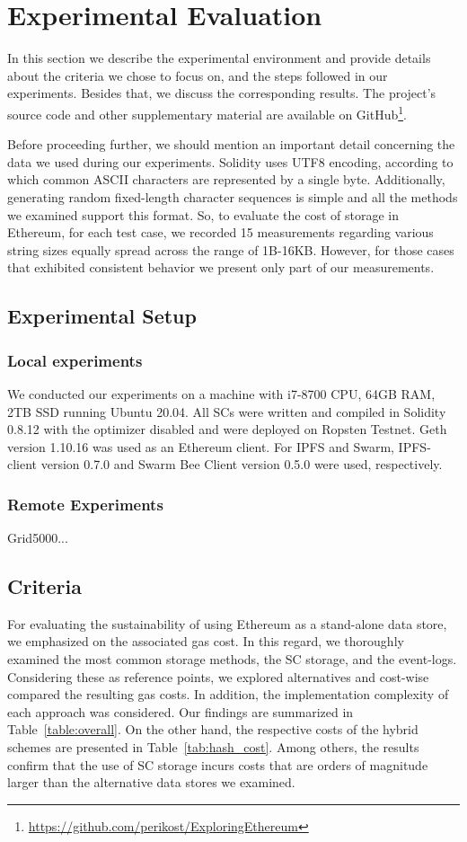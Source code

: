 \chapter{Experimental Evaluation}\label{chapter:experiments}
In this section we describe the experimental environment and provide details about the criteria we chose to focus on, and the steps followed in our experiments. Besides that, we discuss the corresponding results. The project's source code and other supplementary material are available on GitHub\footnote{\url{https://github.com/perikost/ExploringEthereum}}.

Before proceeding further, we should mention an important detail concerning the data we used during our experiments. Solidity uses UTF8 encoding, according to which common ASCII characters are represented by a single byte. Additionally, generating random fixed-length character sequences is simple and all the methods we examined support this format. So, to evaluate the cost of storage in Ethereum, for each test case, we recorded 15 measurements regarding various string sizes equally spread across the range of 1B-16KB. However, for those cases that exhibited consistent behavior we present only part of our measurements.

\section{Experimental Setup}\label{sec:}
\subsection{Local experiments}\label{sec:}
We conducted our experiments on a machine with i7-8700 CPU, 64GB RAM, 2TB SSD running Ubuntu 20.04. All SCs were written and compiled in Solidity 0.8.12 with the optimizer disabled and were deployed on Ropsten Testnet. Geth version 1.10.16 was used as an Ethereum client. For IPFS and Swarm, IPFS-client version 0.7.0 and Swarm Bee Client version 0.5.0 were used, respectively.
\subsection{Remote Experiments}\label{sec:}
Grid5000...
\section{Criteria}\label{sec:}
For evaluating the sustainability of using Ethereum as a stand-alone data store, we emphasized on the associated gas cost. In this regard, we thoroughly examined the most common storage methods, the SC storage, and the event-logs. Considering these as reference points, we explored alternatives and cost-wise compared the resulting gas costs. In addition, the implementation complexity of each approach was considered. Our findings are summarized in Table~\ref{table:overall}. On the other hand, the respective costs of the hybrid schemes are presented in Table~\ref{tab:hash_cost}. Among others, the results confirm that the use of SC storage incurs costs that are orders of magnitude larger than the alternative data stores we examined.

